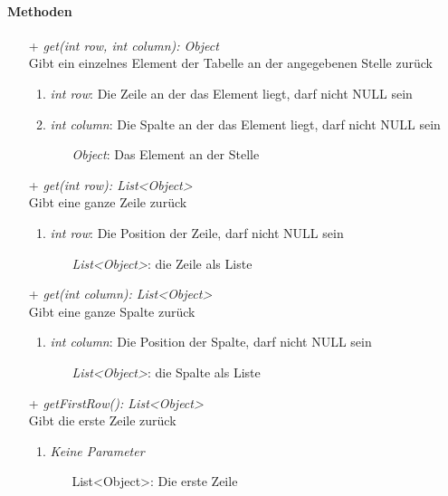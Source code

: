 		

			
\paragraph{Methoden}
\begin{itemize}
	\item[+] \textit{get(int row, int column): Object} \\
	Gibt ein einzelnes Element der Tabelle an der angegebenen Stelle zurück
	\begin{enumerate}
		\item \textit{int row}: Die Zeile an der das Element liegt, darf nicht NULL sein
		\item \textit{int column}: Die Spalte an der das Element liegt, darf nicht NULL sein
		\begin{itemize}
			\item[] \textit{Object}: Das Element an der Stelle
		\end{itemize}
	\end{enumerate}

	\item[+] \textit{get(int row): List<Object>} \\
	Gibt eine ganze Zeile zurück
	\begin{enumerate}
		\item \textit{int row}: Die Position der Zeile, darf nicht NULL sein
		\begin{itemize}
			\item[] \textit{List<Object>}: die Zeile als Liste
		\end{itemize}
	\end{enumerate}

	\item[+] \textit{get(int column): List<Object>} \\
	Gibt eine ganze Spalte zurück
	\begin{enumerate}
	\item \textit{int column}: Die Position der Spalte, darf nicht NULL sein
		\begin{itemize}
			\item[] \textit{List<Object>}: die Spalte als Liste
		\end{itemize}
	\end{enumerate}	
		
	\item[+] \textit{getFirstRow(): List<Object>} \\
	Gibt die erste Zeile zurück
	\begin{enumerate}
		\item \textit{Keine Parameter}
		\begin{itemize}
			\item[] List<Object>: Die erste Zeile
		\end{itemize}
	\end{enumerate}	


\end{itemize}
